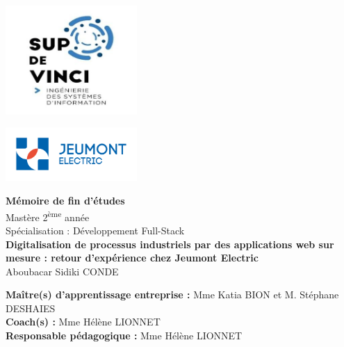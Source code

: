 \documentclass[11pt,a4paper]{article}
\begin{document}
\onehalfspacing

\begin{minipage}[t]{0.4\textwidth}
    \vspace{0pt} %
    \includegraphics[width=5cm]{../Images/logo-sup.jpg}
\end{minipage}
\hfill
\begin{minipage}[t]{0.6\textwidth}
    \vspace{0pt}
    \raggedleft
    \includegraphics[width=5cm]{../Images/logo.png}
\end{minipage}

\vspace{2cm}

\begin{center}
    \LARGE \textbf{Mémoire de fin d'études}\\[1em]
    \Large Mastère 2\textsuperscript{ème} année\\[1em]
    \Large Spécialisation : Développement Full-Stack \\[3em]

   
   \huge \textbf{Digitalisation de processus industriels par des applications web sur mesure : retour d’expérience chez Jeumont Electric}\\[2em]
    \Large Aboubacar Sidiki CONDE
\end{center}

\vfill

\begin{flushleft}
    \textbf{Maître(s) d’apprentissage entreprise :} Mme Katia BION et M. Stéphane DESHAIES\\[1em]
    \textbf{Coach(s) :} Mme Hélène LIONNET \\[1em]
    \textbf{Responsable pédagogique :} Mme Hélène LIONNET
\end{flushleft}
\end{document}
